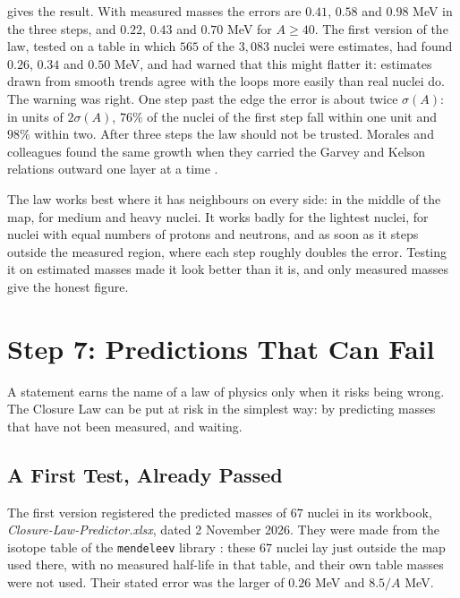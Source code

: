  gives the result. With measured masses the errors are $0.41$, $0.58$ and $0.98$ MeV in the three steps, and $0.22$, $0.43$ and $0.70$ MeV for $A \ge 40$. The first version of the law, tested on a table in which $565$ of the $3{,}083$ nuclei were estimates, had found $0.26$, $0.34$ and $0.50$ MeV, and had warned that this might flatter it: estimates drawn from smooth trends agree with the loops more easily than real nuclei do. The warning was right. One step past the edge the error is about twice $\sigma(A)$: in units of $2\sigma(A)$, $76\%$ of the nuclei of the first step fall within one unit and $98\%$ within two. After three steps the law should not be trusted. Morales and colleagues found the same growth when they carried the Garvey and Kelson relations outward one layer at a time \citep{Morales2009}.

\begin{plainwords}
The law works best where it has neighbours on every side: in the middle of the map, for medium and heavy nuclei. It works badly for the lightest nuclei, for nuclei with equal numbers of protons and neutrons, and as soon as it steps outside the measured region, where each step roughly doubles the error. Testing it on estimated masses made it look better than it is, and only measured masses give the honest figure.
\end{plainwords}

\section{Step 7: Predictions That Can Fail}\label{sec:cl-predictions}

A statement earns the name of a law of physics only when it risks being wrong. The Closure Law can be put at risk in the simplest way: by predicting masses that have not been measured, and waiting.

\subsection{A First Test, Already Passed}\label{subsec:cl-first}

The first version registered the predicted masses of $67$ nuclei in its workbook, \emph{Closure-Law-Predictor.xlsx}, dated 2 November 2026. They were made from the isotope table of the \texttt{mendeleev} library \citep{Mentel2014}: these $67$ nuclei lay just outside the map used there, with no measured half-life in that table, and their own table masses were not used. Their stated error was the larger of $0.26$ MeV and $8.5/A$ MeV.

